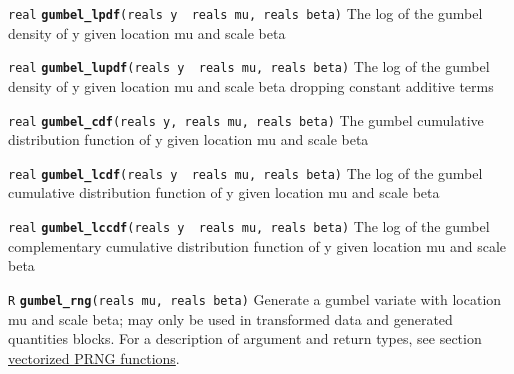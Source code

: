 \documentclass[
  10pt,
]{book}
\begin{document}

\texttt{real} \textbf{\texttt{gumbel\_lpdf}}\texttt{(reals\ y\ \textbar{}\ reals\ mu,\ reals\ beta)}\newline
The log of the gumbel density of y given location mu and scale beta


\texttt{real} \textbf{\texttt{gumbel\_lupdf}}\texttt{(reals\ y\ \textbar{}\ reals\ mu,\ reals\ beta)}\newline
The log of the gumbel density of y given location mu and scale beta
dropping constant additive terms


\texttt{real} \textbf{\texttt{gumbel\_cdf}}\texttt{(reals\ y,\ reals\ mu,\ reals\ beta)}\newline
The gumbel cumulative distribution function of y given location mu and
scale beta


\texttt{real} \textbf{\texttt{gumbel\_lcdf}}\texttt{(reals\ y\ \textbar{}\ reals\ mu,\ reals\ beta)}\newline
The log of the gumbel cumulative distribution function of y given
location mu and scale beta


\texttt{real} \textbf{\texttt{gumbel\_lccdf}}\texttt{(reals\ y\ \textbar{}\ reals\ mu,\ reals\ beta)}\newline
The log of the gumbel complementary cumulative distribution function
of y given location mu and scale beta


\texttt{R} \textbf{\texttt{gumbel\_rng}}\texttt{(reals\ mu,\ reals\ beta)}\newline
Generate a gumbel variate with location mu and scale beta; may only be
used in transformed data and generated quantities blocks. For a description
of argument and return types, see section
\protect\hyperlink{prng-vectorization}{vectorized PRNG functions}.
\end{document}
